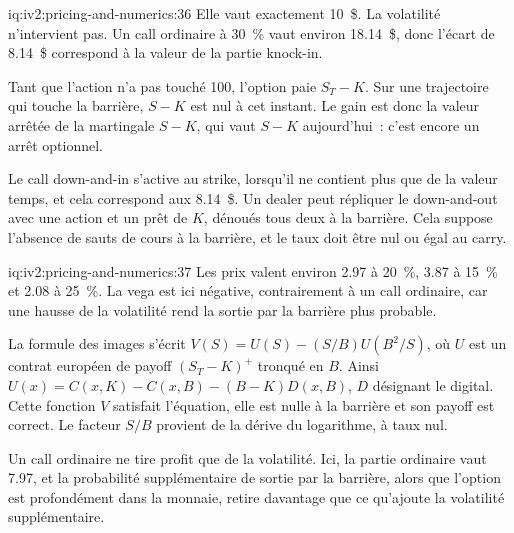 \begin{solution}{iq:iv2:pricing-and-numerics:36}
Elle vaut exactement 10~\$. La volatilité n'intervient pas. Un call ordinaire à 30~\% vaut environ 18.14~\$, donc l'écart de 8.14~\$ correspond à la valeur de la partie knock-in.

Tant que l'action n'a pas touché 100, l'option paie $S_T - K$. Sur une trajectoire qui touche la barrière, $S - K$ est nul à cet instant. Le gain est donc la valeur arrêtée de la martingale $S - K$, qui vaut $S - K$ aujourd'hui~: c'est encore un arrêt optionnel.

Le call down-and-in s'active au strike, lorsqu'il ne contient plus que de la valeur temps, et cela correspond aux 8.14~\$. Un dealer peut répliquer le down-and-out avec une action et un prêt de $K$, dénoués tous deux à la barrière. Cela suppose l'absence de sauts de cours à la barrière, et le taux doit être nul ou égal au carry.

\end{solution}

\begin{solution}{iq:iv2:pricing-and-numerics:37}
Les prix valent environ 2.97 à 20~\%, 3.87 à 15~\% et 2.08 à 25~\%. La vega est ici négative, contrairement à un call ordinaire, car une hausse de la volatilité rend la sortie par la barrière plus probable.

La formule des images s'écrit $V(S) = U(S) - (S/B)U(B^2/S)$, où $U$ est un contrat européen de payoff $(S_T - K)^+$ tronqué en $B$. Ainsi $U(x) = C(x, K) - C(x, B) - (B - K)D(x, B)$, $D$ désignant le digital. Cette fonction $V$ satisfait l'équation, elle est nulle à la barrière et son payoff est correct. Le facteur $S/B$ provient de la dérive du logarithme, à taux nul.

Un call ordinaire ne tire profit que de la volatilité. Ici, la partie ordinaire vaut 7.97, et la probabilité supplémentaire de sortie par la barrière, alors que l'option est profondément dans la monnaie, retire davantage que ce qu'ajoute la volatilité supplémentaire.

\end{solution}

